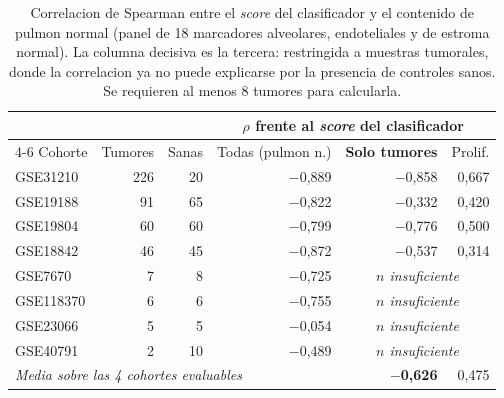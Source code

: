 \begin{table}[htbp]
\centering
\caption[Composicion tisular frente a biologia tumoral]{Correlacion de Spearman
entre el \emph{score} del clasificador y el contenido de pulmon normal
(panel de 18 marcadores alveolares, endoteliales y de estroma normal). La
columna decisiva es la tercera: restringida a muestras tumorales, donde la
correlacion ya no puede explicarse por la presencia de controles sanos. Se
requieren al menos 8 tumores para calcularla.}
\label{tab:composicion}
\small
\begin{tabular}{lrrrrr}
\toprule
& & & \multicolumn{3}{c}{$\rho$ frente al \emph{score} del clasificador} \\
\cmidrule(l){4-6}
Cohorte & Tumores & Sanas & Todas (pulmon n.) & \textbf{Solo tumores} & Prolif. \\
\midrule
GSE31210 & 226 & 20 & $-$0,889 & $-$0,858 & 0,667 \\
GSE19188 & 91 & 65 & $-$0,822 & $-$0,332 & 0,420 \\
GSE19804 & 60 & 60 & $-$0,799 & $-$0,776 & 0,500 \\
GSE18842 & 46 & 45 & $-$0,872 & $-$0,537 & 0,314 \\
GSE7670 & 7 & 8 & $-$0,725 & \multicolumn{2}{c}{\emph{$n$ insuficiente}} \\
GSE118370 & 6 & 6 & $-$0,755 & \multicolumn{2}{c}{\emph{$n$ insuficiente}} \\
GSE23066 & 5 & 5 & $-$0,054 & \multicolumn{2}{c}{\emph{$n$ insuficiente}} \\
GSE40791 & 2 & 10 & $-$0,489 & \multicolumn{2}{c}{\emph{$n$ insuficiente}} \\
\midrule
\multicolumn{4}{l}{\emph{Media sobre las 4 cohortes evaluables}} &
\textbf{$-$0,626} &
0,475 \\
\bottomrule
\end{tabular}
\end{table}
